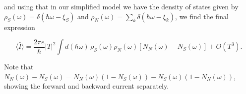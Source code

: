 and using that in our simplified model we have the density of states given by $\rho_S(\omega) = \delta(\hbar\omega-\xi_S)$ and $\rho_N(\omega) = \sum_k\delta(\hbar\omega-\xi_k)$, we find the final expression
\begin{tcolorbox}[colback=gray!20!white]
\begin{equation}\label{eq:current}
    \langle\hat{I}\rangle = \frac{2\pi e}{\hbar}|T|^2 \int d(\hbar\omega)\, \rho_S(\omega)\rho_N(\omega)\left[N_N(\omega)-N_S(\omega)\right] + O(T^3).
\end{equation}
\end{tcolorbox}
Note that $N_N(\omega)-N_S(\omega) = N_N(\omega)(1-N_S(\omega)) - N_S(\omega)(1-N_N(\omega))$, showing the forward and backward current separately.








